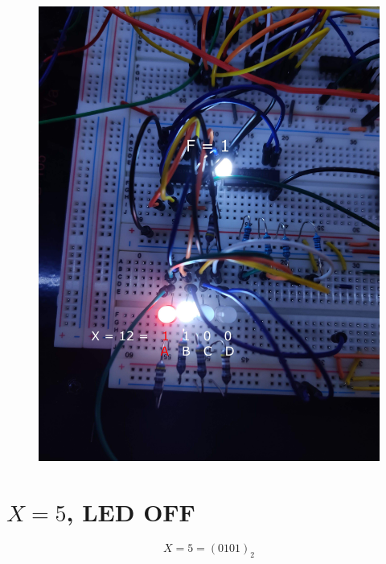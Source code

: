 \documentclass{article}
\begin{document}
\begin{figure}[ht!]
    \centering
    \includegraphics[width=\textwidth]{X_12_1100.jpg}
\end{figure}

\pagebreak

\section{$X=5$, LED OFF}
$$X=5=(0101)_2$$
\end{document}
